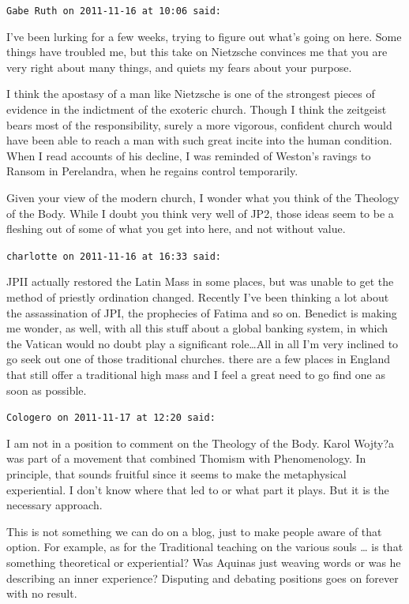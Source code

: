 \begin{footnotesize}\begin{sffamily}



\texttt{Gabe Ruth on 2011-11-16 at 10:06 said: }

I've been lurking for a few weeks, trying to figure out what's going on here. Some things have troubled me, but this take on Nietzsche convinces me that you are very right about many things, and quiets my fears about your purpose. 

I think the apostasy of a man like Nietzsche is one of the strongest pieces of evidence in the indictment of the exoteric church. Though I think the zeitgeist bears most of the responsibility, surely a more vigorous, confident church would have been able to reach a man with such great incite into the human condition. When I read accounts of his decline, I was reminded of Weston's ravings to Ransom in Perelandra, when he regains control temporarily.

Given your view of the modern church, I wonder what you think of the Theology of the Body. While I doubt you think very well of JP2, those ideas seem to be a fleshing out of some of what you get into here, and not without value.


\hfill

\texttt{charlotte on 2011-11-16 at 16:33 said: }

JPII actually restored the Latin Mass in some places, but was unable to get the method of priestly ordination changed. Recently I've been thinking a lot about the assassination of JPI, the prophecies of Fatima and so on. Benedict is making me wonder, as well, with all this stuff about a global banking system, in which the Vatican would no doubt play a significant role…All in all I'm very inclined to go seek out one of those traditional churches. there are a few places in England that still offer a traditional high mass and I feel a great need to go find one as soon as possible.


\hfill

\texttt{Cologero on 2011-11-17 at 12:20 said: }

I am not in a position to comment on the Theology of the Body. Karol Wojty?a was part of a movement that combined Thomism with Phenomenology. In principle, that sounds fruitful since it seems to make the metaphysical experiential. I don't know where that led to or what part it plays. But it is the necessary approach.

This is not something we can do on a blog, just to make people aware of that option. For example, as for the Traditional teaching on the various souls … is that something theoretical or experiential? Was Aquinas just weaving words or was he describing an inner experience? Disputing and debating positions goes on forever with no result.


\end{sffamily}
\end{footnotesize}

